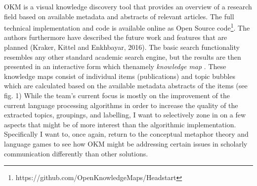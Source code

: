 OKM is a visual knowledge discovery tool that provides an overview of a research field based on available metadata and abstracts of relevant articles. The full technical implementation and code is available online as Open Source code\footnote{https://github.com/OpenKnowledgeMaps/Headstart}. The authors furthermore have described the future work and features that are planned (Kraker, Kittel and Enkhbayar, 2016). The basic search functionality resembles any other standard academic search engine, but the results are then presented in an interactive form which thenamely \textit{knowledge map} . These knowledge maps consist of individual items
(publications) and topic bubbles which are calculated based on the available metadata abstracts of the items (see fig. 1) While the team’s current focus is mostly on the improvement of the current language processing algorithms in order to increase the quality of the extracted topics, groupings, and labelling, I want to selectively zone in on a few aspects that might be of more interest than the algorithmic implementation. Specifically I want to, once again, return to the
conceptual metaphor theory and language games to see how OKM might be addressing certain issues in scholarly communication differently than other solutions.